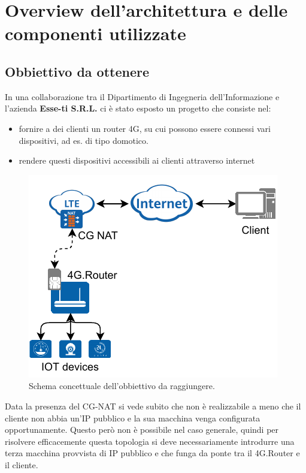 

\chapter{Overview dell'architettura e delle componenti utilizzate}

\label{ch:overview}

\section{Obbiettivo da ottenere}

In una collaborazione tra il Dipartimento di Ingegneria dell'Informazione e l'azienda \textbf{Esse-ti S.R.L.} ci è stato esposto un progetto che consiste nel:

\begin{itemize}
	\item fornire a dei clienti un router 4G, su cui possono essere connessi vari dispositivi, ad es. di tipo domotico.
	\item rendere questi dispositivi accessibili ai clienti attraverso internet
\end{itemize}

\begin{figure}[H]
	\centering
	\includegraphics[width=0.5\linewidth]{immagini/diag-goal}
	\caption{Schema concettuale dell'obbiettivo da raggiungere. \cite{icons}}

	\label{fig:schema_concettuale}

\end{figure}

Data la presenza del CG-NAT si vede subito che non è realizzabile a meno che il cliente non abbia un'IP pubblico e la sua macchina venga configurata opportunamente. Questo però non è possibile nel caso generale, quindi per risolvere efficacemente questa topologia si deve necessariamente introdurre una terza macchina provvista di IP pubblico e che funga da ponte tra il 4G.Router e il cliente.


